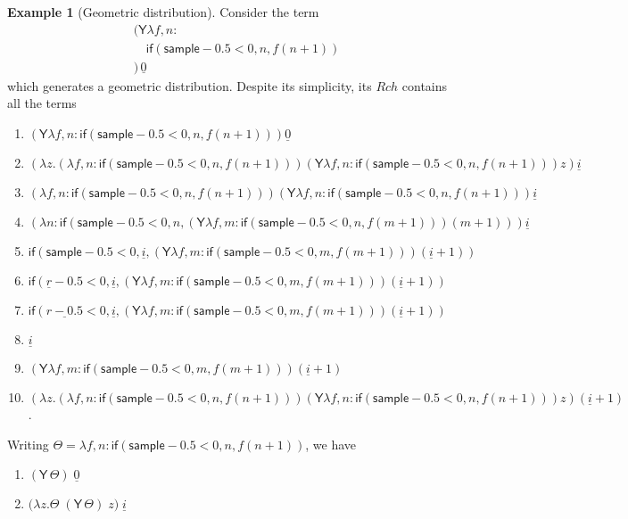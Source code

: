 \documentclass{article}
\newcommand{\tY}{\mathsf{Y}}
\newcommand{\tif}[3]{\mathsf{if}(#1, #2, #3)} %
\newcommand{\tsample}{\mathsf{sample}}
\theoremstyle{definition}
\newtheorem{example}{Example}
\theoremstyle{lemma}
\theoremstyle{remark}
\begin{document}
\begin{example}[Geometric distribution]
Consider the term
\begin{align*}
&(\tY \lambda f, n: \\
&\quad \tif{\tsample - 0.5 < 0}{n}{f (n+1)} \\
&) \, \underline{0}
\end{align*}
which generates a geometric distribution.
    Despite its simplicity, its $Rch$ contains all the terms
\begin{enumerate}
    \item $(\tY \lambda f, n: \tif{\tsample - 0.5 < 0}{n}{f (n+1)}) \underline{0}$
    \item $(\lambda z.(\lambda f, n: \tif{\tsample - 0.5 < 0}{n}{f (n+1)}) (\tY \lambda f, n: \tif{\tsample - 0.5 < 0}{n}{f (n+1)}) z) \underline{i}$
    \item $(\lambda f, n: \tif{\tsample - 0.5 < 0}{n}{f (n+1)}) (\tY \lambda f, n: \tif{\tsample - 0.5 < 0}{n}{f (n+1)}) \underline{i}$
    \item $(\lambda n: \tif{\tsample - 0.5 < 0}{n}{(\tY \lambda f, m: \tif{\tsample - 0.5 < 0}{n}{f (m+1)}) (m+1)}) \underline{i}$
    \item $\tif{\tsample - 0.5 < 0}{\underline{i}}{(\tY \lambda f, m: \tif{\tsample - 0.5 < 0}{m}{f (m+1)}) (\underline{i}+1)}$
    \item $\tif{\underline r - 0.5 < 0}{\underline{i}}{(\tY \lambda f, m: \tif{\tsample - 0.5 < 0}{m}{f (m+1)}) (\underline{i}+1)}$
    \item $\tif{\underline{r - 0.5} < 0}{\underline{i}}{(\tY \lambda f, m: \tif{\tsample - 0.5 < 0}{m}{f (m+1)}) (\underline{i}+1)}$
    \item $\underline{i}$
    \item $(\tY \lambda f, m: \tif{\tsample - 0.5 < 0}{m}{f (m+1)}) (\underline{i}+1)$
    \item $(\lambda z.(\lambda f, n: \tif{\tsample - 0.5 < 0}{n}{f (n+1)}) (\tY \lambda f, n: \tif{\tsample - 0.5 < 0}{n}{f (n+1)}) z) (\underline{i} + 1)$.
\end{enumerate}


Writing $\Theta = \lambda f, n : \tif{\tsample - 0.5 < 0}{n}{f (n+1)}$, we have
\begin{enumerate}
    \item $(\tY \, \Theta) \; \underline{0}$

    \item $\big(\lambda z.\Theta \; (\tY \, \Theta) \; z \big) \; \underline{i}$
    

\end{enumerate}
\end{example}
\end{document}
